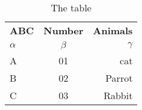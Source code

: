 \documentclass{article}
\begin{document}
  
                 \begin{table}[h!]  
                     \begin{center}  
                         \caption{ The table}  
                         \label{tab:Table1}  
                             \begin{tabular}{|l|c|r|} 
                             \hline
       \textbf{ABC} & \textbf{Number} & \textbf{Animals}\\  
                            $\alpha$ & $\beta$ & $\gamma$ \\  
                            \hline  
                             A & 01 & cat\\ \hline
                             B & 02 & Parrot\\\hline
                             C & 03 & Rabbit\\ \hline 
                          \end{tabular}  
                     \end{center}  
              \end{table}  
\end{document}
